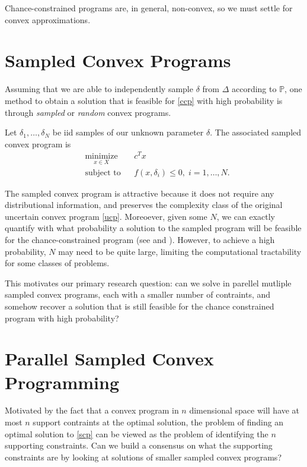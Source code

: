 \documentclass[12pt]{article}
\begin{document}
Chance-constrained programs are, in general, non-convex, so we must settle for
convex approximations.

\section{Sampled Convex Programs}
Assuming that we are able to independently sample $\delta$ from $\Delta$ according
to $\mathbb{P}$, one method to obtain a solution that is feasible for \ref{ccp} with 
high probability is through \emph{sampled} or \emph{random} convex programs.

Let $\delta_1, \ldots, \delta_N$ be iid samples of our unknown parameter $\delta$.
The associated sampled convex program is
\begin{equation} \label{scp}
\begin{aligned}
& \underset{x \in X}{\text{minimize}}
& & c^T x \\
& \text{subject to}
& & f(x, \delta_i) \leq 0, \; i = 1, \ldots, N.
\end{aligned} \tag{SCP}
\end{equation}

The sampled convex program is attractive because it does not require any distributional
information, and preserves the complexity class of the original uncertain convex program \ref{ucp}.
Moreoever, given some $N$, we can exactly quantify with what probability a solution 
to the sampled program will be feasible for the chance-constrained program 
(see \cite{campi04} and \cite{campi08}). However, to achieve a high probability, $N$
may need to be quite large, limiting the computational tractability for some classes
of problems.

This motivates our primary research question: can we solve in parellel 
mutliple sampled convex programs, each with a smaller number of contraints, 
and somehow recover a solution that is still feasible for the chance constrained
program with high probability?

\section{Parallel Sampled Convex Programming}
Motivated by the fact that a convex program in $n$ dimensional space will have at most $n$
support contraints at the optimal solution, the problem of finding an optimal solution to \ref{scp} can be viewed as the problem of identifying the $n$ supporting constraints.
Can we build a consensus on what the supporting constraints are by looking at solutions of 
smaller sampled convex programs? 
\end{document}
